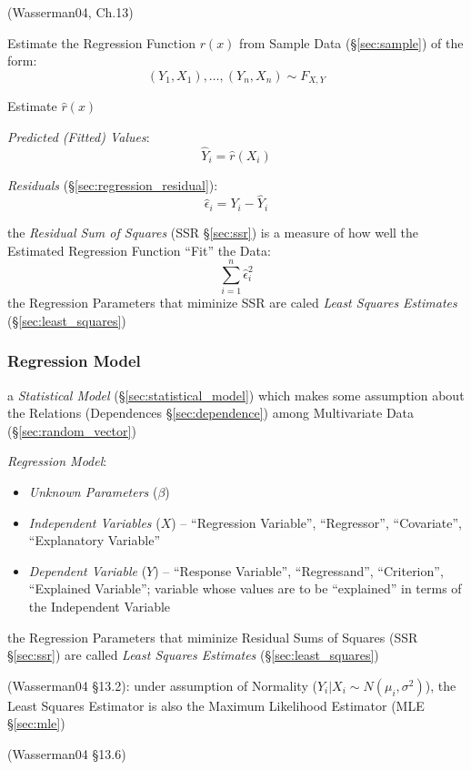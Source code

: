 \asterism

(Wasserman04, Ch.13)

Estimate the Regression Function $r(x)$ from Sample Data (\S\ref{sec:sample}) of
the form:
\[
  (Y_1,X_1), \ldots, (Y_n,X_n) \sim F_{X,Y}
\]

Estimate $\hat{r}(x)$

\emph{Predicted (Fitted) Values}:
\[
  \hat{Y}_i = \hat{r}(X_i)
\]

\emph{Residuals} (\S\ref{sec:regression_residual}):
\[
  \hat{\epsilon}_i = Y_i - \hat{Y}_i
\]

the \emph{Residual Sum of Squares} (SSR \S\ref{sec:ssr}) is a measure of how
well the Estimated Regression Function ``Fit'' the Data:
\[
  \sum_{i=1}^n \hat{\epsilon}_i^2
\]
the Regression Parameters that miminize SSR are caled \emph{Least Squares
  Estimates} (\S\ref{sec:least_squares})



\subsubsection{Regression Model}\label{sec:regression_model}

a \emph{Statistical Model} (\S\ref{sec:statistical_model}) which makes some
assumption about the Relations (Dependences \S\ref{sec:dependence}) among
Multivariate Data (\S\ref{sec:random_vector})

\emph{Regression Model}:
\begin{itemize}
  \item \emph{Unknown Parameters} ($\beta$)
  \item \emph{Independent Variables} ($X$) -- ``Regression Variable'',
    ``Regressor'', ``Covariate'', ``Explanatory Variable''
  \item \emph{Dependent Variable} ($Y$) -- ``Response Variable'',
    ``Regressand'', ``Criterion'', ``Explained Variable''; variable whose values
    are to be ``explained'' in terms of the Independent Variable
\end{itemize}

the Regression Parameters that miminize Residual Sums of Squares (SSR
\S\ref{sec:ssr}) are called \emph{Least Squares Estimates}
(\S\ref{sec:least_squares})

(Wasserman04 \S13.2):
 under assumption of Normality ($Y_i | X_i \sim N(\mu_i, \sigma^2)$), the Least
 Squares Estimator is also the Maximum Likelihood Estimator (MLE
 \S\ref{sec:mle})

(Wasserman04 \S13.6)

